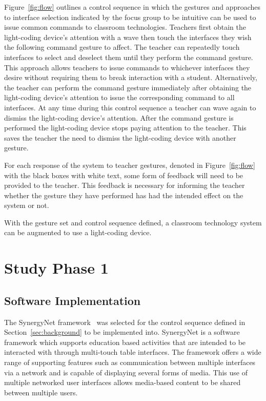 \documentclass[link]{IWCOMP}
\begin{document}
Figure~\ref{fig:flow} outlines a control sequence in which the gestures and approaches to interface selection indicated by the focus group to be intuitive can be used to issue common commands to classroom technologies.
Teachers first obtain the light-coding device's attention with a wave then touch the interfaces they wish the following command gesture to affect.
The teacher can repeatedly touch interfaces to select and deselect them until they perform the command gesture.
This approach allows teachers to issue commands to whichever interfaces they desire without requiring them to break interaction with a student.
Alternatively, the teacher can perform the command gesture immediately after obtaining the light-coding device's attention to issue the corresponding command to all interfaces.
At any time during this control sequence a teacher can wave again to dismiss the light-coding device's attention.
After the command gesture is performed the light-coding device stops paying attention to the teacher.
This saves the teacher the need to dismiss the light-coding device with another gesture.

For each response of the system to teacher gestures, denoted in Figure~\ref{fig:flow} with the black boxes with white text, some form of feedback will need to be provided to the teacher.
This feedback is necessary for informing the teacher whether the gesture they have performed has had the intended effect on the system or not.

With the gesture set and control sequence defined, a classroom technology system can be augmented to use a light-coding device.

\section{Study Phase 1} 
\label{sec:studyPhase1}


\subsection{Software Implementation}
\label{subsec:studyPhase1Implementation}


The SynergyNet framework~\cite{Higgins2011} was selected for the control sequence defined in Section~\ref{sec:background} to be implemented into.
SynergyNet is a software framework which supports education based activities that are intended to be interacted with through multi-touch table interfaces.
The framework offers a wide range of supporting features such as communication between multiple interfaces via a network and is capable of displaying several forms of media.
This use of multiple networked user interfaces allows media-based content to be shared between multiple users.
\end{document}
